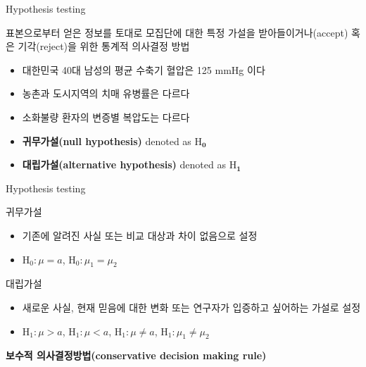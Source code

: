 \documentclass[9pt,ignorenonframetext,xcolor=dvipsnames]{beamer}
\providecommand{\tightlist}{%
  \setlength{\itemsep}{0pt}\setlength{\parskip}{0pt}}
\newlength{\wideitemsep}
\let\olditem\item
\renewcommand{\item}{\setlength{\itemsep}{\wideitemsep}\olditem}
\begin{document}
\begin{frame}{Hypothesis testing}

\begin{mdframed}[backgroundcolor = gray!30]
표본으로부터 얻은 정보를 토대로 모집단에 대한 특정 가설을 받아들이거나(accept) 혹은 기각(reject)을 위한 통계적 의사결정 방법
\end{mdframed}

\begin{itemize}
\tightlist
\item
  대한민국 40대 남성의 평균 수축기 혈압은 125 mmHg 이다
\item
  농촌과 도시지역의 치매 유병률은 다르다
\item
  소화불량 환자의 변증별 복압도는 다르다
\end{itemize}

\begin{tcolorbox}[colback=gray!10,colframe=black, title=\textbf{통계적 가설의 유형}]
  \begin{itemize}
    \item \textbf{귀무가설(null hypothesis)} denoted as $\bm{\mathrm{H}_{0}}$
    \item \textbf{대립가설(alternative hypothesis)} denoted as $\bm{\mathrm{H}_{1}}$
  \end{itemize}
\end{tcolorbox}

\end{frame}

\begin{frame}{Hypothesis testing}

\begin{block}{귀무가설}

\begin{itemize}
\tightlist
\item
  기존에 알려진 사실 또는 비교 대상과 차이 없음으로 설정
\item
  \(\mathrm{H}_{0}: \mu = a\), \(\mathrm{H}_{0}: \mu_{1} = \mu_{2}\)
\end{itemize}

\end{block}

\begin{block}{대립가설}

\begin{itemize}
\tightlist
\item
  새로운 사실, 현재 믿음에 대한 변화 또는 연구자가 입증하고 싶어하는
  가설로 설정
\item
  \(\mathrm{H}_{1}: \mu > a\), \(\mathrm{H}_{1}: \mu < a\),
  \(\mathrm{H}_{1}: \mu \neq a\),
  \(\mathrm{H}_{1}: \mu_{1} \neq \mu_{2}\)
\end{itemize}

\textbf{보수적 의사결정방법(conservative decision making rule)}

\end{block}

\end{frame}
\end{document}
